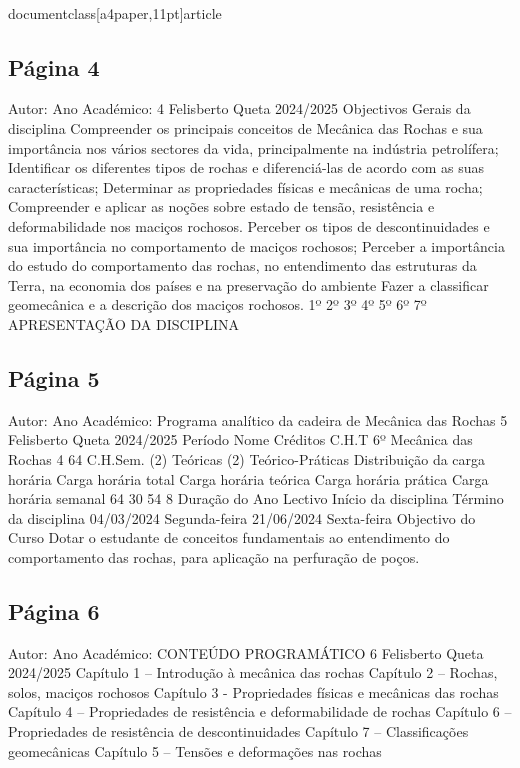 \\documentclass[a4paper,11pt]{article}
\begin{document}
\subsection*{Página 4}
Autor:
Ano Académico:
4
Felisberto Queta
2024/2025
Objectivos Gerais da disciplina
Compreender os principais conceitos de Mecânica das Rochas e sua importância nos 
vários sectores da vida, principalmente na indústria petrolífera;
Identificar os diferentes tipos de rochas e diferenciá-las de acordo com as suas 
características;
Determinar as propriedades físicas e mecânicas de uma rocha;
Compreender e aplicar as noções sobre estado de tensão,  resistência e 
deformabilidade nos maciços rochosos. 
Perceber os tipos de descontinuidades e sua importância no comportamento de 
maciços rochosos; 
Perceber a importância do estudo do comportamento das rochas, no entendimento 
das estruturas da Terra, na economia dos países e na preservação do ambiente
Fazer a classificar geomecânica e a descrição dos maciços rochosos.
1º
2º
3º
4º
5º
6º
7º
APRESENTAÇÃO DA DISCIPLINA



\subsection*{Página 5}
Autor:
Ano Académico:
Programa analítico da cadeira de Mecânica das Rochas
5
Felisberto Queta
2024/2025
Período 
Nome
Créditos 
C.H.T 
6º
Mecânica das Rochas
4
64
C.H.Sem. 
(2) Teóricas (2) Teórico-Práticas 
Distribuição da carga horária
Carga horária total 
Carga horária teórica
Carga horária prática 
Carga horária 
semanal 
64
30
54
8
Duração do Ano Lectivo
Início da disciplina
Término da disciplina
04/03/2024 Segunda-feira
21/06/2024 Sexta-feira
Objectivo do Curso
Dotar o estudante de conceitos fundamentais ao entendimento do comportamento das
rochas, para aplicação na perfuração de poços.



\subsection*{Página 6}
Autor:
Ano Académico:
CONTEÚDO PROGRAMÁTICO
6
Felisberto Queta
2024/2025
Capítulo 1 – Introdução à mecânica das rochas 
Capítulo 2 – Rochas, solos, maciços rochosos
Capítulo 3 - Propriedades físicas e mecânicas das rochas 
Capítulo 4 – Propriedades de resistência e deformabilidade de rochas
Capítulo 6 – Propriedades de resistência de descontinuidades
Capítulo 7 – Classificações geomecânicas
Capítulo 5 – Tensões e deformações nas rochas
\end{document}
